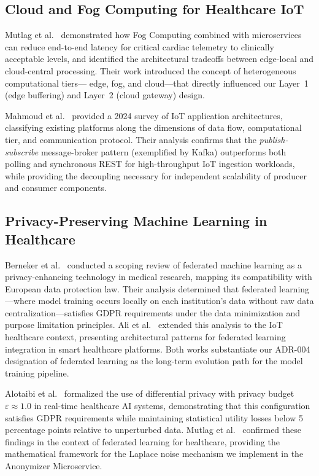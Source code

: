 \documentclass[conference]{IEEEtran}
\begin{document}
\subsection{Cloud and Fog Computing for Healthcare IoT}

Mutlag et al.\ \cite{b5} demonstrated how Fog Computing combined with microservices
can reduce end-to-end latency for critical cardiac telemetry to clinically acceptable
levels, and identified the architectural tradeoffs between edge-local and cloud-central
processing. Their work introduced the concept of heterogeneous computational tiers---
edge, fog, and cloud---that directly influenced our Layer~1 (edge buffering) and
Layer~2 (cloud gateway) design.

Mahmoud et al.\ \cite{b6} provided a 2024 survey of IoT application architectures,
classifying existing platforms along the dimensions of data flow, computational tier,
and communication protocol. Their analysis confirms that the \textit{publish-subscribe}
message-broker pattern (exemplified by Kafka) outperforms both polling and
synchronous REST for high-throughput IoT ingestion workloads, while providing
the decoupling necessary for independent scalability of producer and consumer components.

\subsection{Privacy-Preserving Machine Learning in Healthcare}

Berneker et al.\ \cite{b13} conducted a scoping review of federated machine learning
as a privacy-enhancing technology in medical research, mapping its compatibility with
European data protection law. Their analysis determined that federated learning---where
model training occurs locally on each institution's data without raw data
centralization---satisfies GDPR requirements under the data minimization and purpose
limitation principles. Ali et al.\ \cite{b14} extended this analysis to the IoT
healthcare context, presenting architectural patterns for federated learning integration
in smart healthcare platforms. Both works substantiate our ADR-004 designation of
federated learning as the long-term evolution path for the model training pipeline.

Alotaibi et al.\ \cite{b11} formalized the use of differential privacy with privacy
budget $\varepsilon \approx 1.0$ in real-time healthcare AI systems, demonstrating
that this configuration satisfies GDPR requirements while maintaining statistical utility
losses below 5 percentage points relative to unperturbed data. Mutlag et al.\ \cite{b23}
confirmed these findings in the context of federated learning for healthcare, providing
the mathematical framework for the Laplace noise mechanism we implement in the
Anonymizer Microservice.
\end{document}
